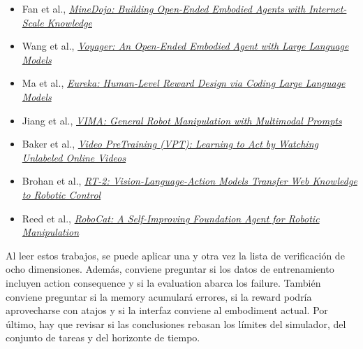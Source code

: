 \begingroup
\footnotesize
\begin{itemize}[itemsep=0pt,topsep=0.15em,parsep=0pt]
  \item Fan et al., \href{https://arxiv.org/abs/2206.08853}{\emph{MineDojo: Building Open-Ended Embodied Agents with Internet-Scale Knowledge}}
  \item Wang et al., \href{https://arxiv.org/abs/2305.16291}{\emph{Voyager: An Open-Ended Embodied Agent with Large Language Models}}
  \item Ma et al., \href{https://arxiv.org/abs/2310.12931}{\emph{Eureka: Human-Level Reward Design via Coding Large Language Models}}
  \item Jiang et al., \href{https://arxiv.org/abs/2210.03094}{\emph{VIMA: General Robot Manipulation with Multimodal Prompts}}
  \item Baker et al., \href{https://arxiv.org/abs/2206.11795}{\emph{Video PreTraining (VPT): Learning to Act by Watching Unlabeled Online Videos}}
  \item Brohan et al., \href{https://arxiv.org/abs/2307.15818}{\emph{RT-2: Vision-Language-Action Models Transfer Web Knowledge to Robotic Control}}
  \item Reed et al., \href{https://arxiv.org/abs/2306.11706}{\emph{RoboCat: A Self-Improving Foundation Agent for Robotic Manipulation}}
\end{itemize}

Al leer estos trabajos, se puede aplicar una y otra vez la lista de verificación de ocho dimensiones. Además, conviene preguntar si los datos de entrenamiento incluyen action consequence y si la evaluation abarca los failure. También conviene preguntar si la memory acumulará errores, si la reward podría aprovecharse con atajos y si la interfaz conviene al embodiment actual. Por último, hay que revisar si las conclusiones rebasan los límites del simulador, del conjunto de tareas y del horizonte de tiempo.
\endgroup


